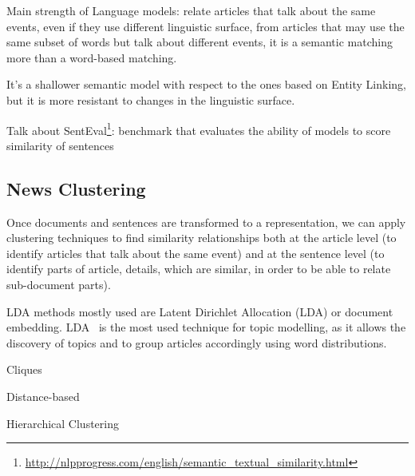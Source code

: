 Main strength of Language models:
relate articles that talk about the same events, even if they use different linguistic surface, from articles that may use the same subset of words but talk about different events, it is a semantic matching more than a word-based matching. 

It's a shallower semantic model with respect to the ones based on Entity Linking, but it is more resistant to changes in the linguistic surface.

Talk about SentEval\footnote{\url{http://nlpprogress.com/english/semantic_textual_similarity.html}}: benchmark that evaluates the ability of models to score similarity of sentences




\subsection{News Clustering}
\label{ssec:lit_relationships_clustering}

Once documents and sentences are transformed to a representation, we can apply clustering techniques to find similarity relationships both at the article level (to identify articles that talk about the same event) and at the sentence level (to identify parts of article, details, which are similar, in order to be able to relate sub-document parts).

LDA
methods mostly used are Latent Dirichlet Allocation (LDA) or document embedding.
LDA~\cite{blei2003latent} is the most used technique for topic modelling, as it allows the discovery of topics and to group articles accordingly using word distributions.

Cliques

Distance-based

Hierarchical Clustering


